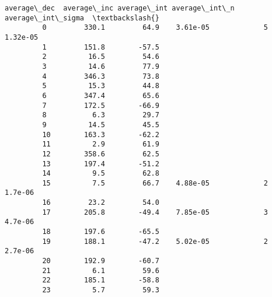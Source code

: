 \documentclass{article}
\begin{document}
\begin{Verbatim}[commandchars=\\\{\}]
             average\_dec  average\_inc average\_int average\_int\_n average\_int\_sigma  \textbackslash{}
         0         330.1         64.9    3.61e-05             5          1.32e-05   
         1         151.8        -57.5                                               
         2          16.5         54.6                                               
         3          14.6         77.9                                               
         4         346.3         73.8                                               
         5          15.3         44.8                                               
         6         347.4         65.6                                               
         7         172.5        -66.9                                               
         8           6.3         29.7                                               
         9          14.5         45.5                                               
         10        163.3        -62.2                                               
         11          2.9         61.9                                               
         12        358.6         62.5                                               
         13        197.4        -51.2                                               
         14          9.5         62.8                                               
         15          7.5         66.7    4.88e-05             2           1.7e-06   
         16         23.2         54.0                                               
         17        205.8        -49.4    7.85e-05             3           4.7e-06   
         18        197.6        -65.5                                               
         19        188.1        -47.2    5.02e-05             2           2.7e-06   
         20        192.9        -60.7                                               
         21          6.1         59.6                                               
         22        185.1        -58.8                                               
         23          5.7         59.3                                               
         

\end{Verbatim}
\end{document}
